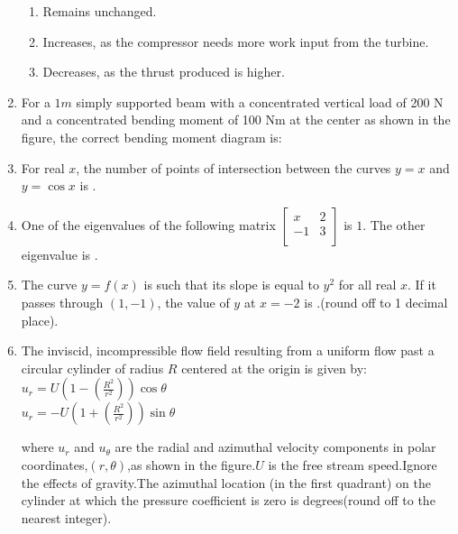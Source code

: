 \documentclass[journal,12pt,onecolumn]{IEEEtran}
\theoremstyle{remark}
\begin{document}
\begin{enumerate}
\begin{enumerate}
        \item Remains unchanged.
        \item Increases, as the compressor needs more work input from the turbine.
        \item Decreases, as the thrust produced is higher.
    \end{enumerate}
    \item For a $1 m$ simply supported beam with a concentrated vertical load of 200 N and a concentrated bending moment of 100 Nm at the center as shown in the figure, the correct bending moment diagram is:
  \begin{figure}[H]
        \centering
         
    \end{figure}
    \item For real $x$, the number of points of intersection between the curves $y = x$ and $y = \cos x$ is {\underline{\hspace{1cm}}}.
    
    \item One of the eigenvalues of the following matrix 
    $\begin{bmatrix}
x & 2 \\
-1 & 3 \\
\end{bmatrix}$
is $1$. The other eigenvalue is {\underline{\hspace{1cm}}}.
    
    \item The curve $y = f(x)$ is such that its slope is equal to $y^2$ for all real $x$. If it passes through $(1, -1)$, the value of $y$ at $x = -2$ is {\underline{\hspace{1cm}}}.(round  off to 1 decimal place).
    
    \item The inviscid, incompressible flow field resulting from a uniform flow past a circular cylinder of radius $R$ centered at the origin is given by:\\
    $u_r=U(1-(\frac{R^2}{r^2}))\cos \theta$ \\      $u_r=-U(1+(\frac{R^2}{r^2}))\sin \theta$
  \begin{figure}[H]
        \centering
          
    \end{figure}
    where $u_r$ and $u_\theta$ are the radial and azimuthal velocity components in polar coordinates,$(r,\theta)$,as shown in the figure.$U$ is the free stream speed.Ignore the effects of gravity.The azimuthal location (in the first quadrant) on the cylinder at which the pressure coefficient is zero is {\underline{\hspace{1cm}}} degrees(round off to the nearest integer).


\end{enumerate}
\end{document}
